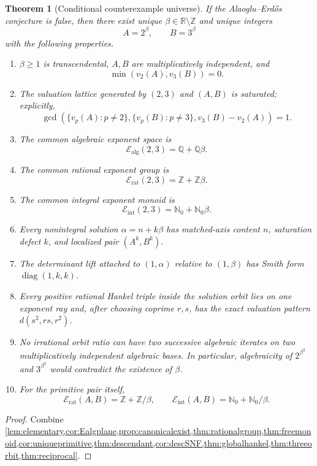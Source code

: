 \documentclass[11pt]{article}
\numberwithin{equation}{section}
\newtheorem{theorem}{Theorem}[section]
\theoremstyle{definition}
\newcommand{\Q}{\mathbb{Q}}
\newcommand{\Z}{\mathbb{Z}}
\newcommand{\N}{\mathbb{N}}
\newcommand{\R}{\mathbb{R}}
\newcommand{\Ealg}{\mathcal E_{\mathrm{alg}}}
\newcommand{\Erat}{\mathcal E_{\mathrm{rat}}}
\newcommand{\Eint}{\mathcal E_{\mathrm{int}}}
\begin{document}
\begin{theorem}[Conditional counterexample universe]\label{thm:universe}
If the Alaoglu--Erd\H{o}s conjecture is false, then there exist unique \(\beta\in\R\setminus\Z\) and unique integers
\[
       A=2^\beta,\qquad B=3^\beta
\]
with the following properties.
\begin{enumerate}[label=\textup{(\roman*)}]
\item \(\beta\ge1\) is transcendental, \(A,B\) are multiplicatively independent, and
\[
       \min(v_2(A),v_3(B))=0.
\]
\item The valuation lattice generated by \((2,3)\) and \((A,B)\) is saturated; explicitly,
\[
 \gcd\!\left(
 \{v_p(A):p\ne2\},
 \{v_p(B):p\ne3\},
 v_3(B)-v_2(A)
 \right)=1.
\]
\item The common algebraic exponent space is
\[
       \Ealg(2,3)=\Q+\Q\beta.
\]
\item The common rational exponent group is
\[
       \Erat(2,3)=\Z+\Z\beta.
\]
\item The common integral exponent monoid is
\[
       \Eint(2,3)=\N_0+\N_0\beta.
\]
\item Every nonintegral solution \(\alpha=n+k\beta\) has matched-axis content \(n\), saturation defect \(k\), and localized pair \((A^k,B^k)\).
\item The determinant lift attached to \((1,\alpha)\) relative to \((1,\beta)\) has Smith form \(\operatorname{diag}(1,k,k)\).
\item Every positive rational Hankel triple inside the solution orbit lies on one exponent ray and, after choosing coprime \(r,s\), has the exact valuation pattern \(d(s^2,rs,r^2)\).
\item No irrational orbit ratio can have two successive algebraic iterates on two multiplicatively independent algebraic bases. In particular, algebraicity of \(2^{\beta^2}\) and \(3^{\beta^2}\) would contradict the existence of \(\beta\).
\item For the primitive pair itself,
\[
       \Erat(A,B)=\Z+\Z/\beta,
       \qquad
       \Eint(A,B)=\N_0+\N_0/\beta.
\]
\end{enumerate}
\end{theorem}

\begin{proof}
Combine \cref{lem:elementary,cor:Ealgplane,prop:canonicalexist,thm:rationalgroup,thm:freemonoid,cor:uniqueprimitive,thm:descendant,cor:descSNF,thm:globalhankel,thm:threeorbit,thm:reciprocal}.
\end{proof}
\end{document}
